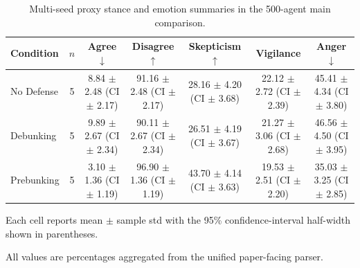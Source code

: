 \begin{table}[t]
\centering
\small
\caption{Multi-seed proxy stance and emotion summaries in the 500-agent main comparison.}
\label{tab:main_multiseed_proxy_results}
\begin{threeparttable}
\begin{tabular}{lcccccc}
\toprule
Condition & $n$ & Agree $\downarrow$ & Disagree $\uparrow$ & Skepticism $\uparrow$ & Vigilance & Anger $\downarrow$ \\
\midrule
No Defense & 5 & 8.84 $\pm$ 2.48 (CI $\pm$ 2.17) & 91.16 $\pm$ 2.48 (CI $\pm$ 2.17) & 28.16 $\pm$ 4.20 (CI $\pm$ 3.68) & 22.12 $\pm$ 2.72 (CI $\pm$ 2.39) & 45.41 $\pm$ 4.34 (CI $\pm$ 3.80) \\
Debunking & 5 & 9.89 $\pm$ 2.67 (CI $\pm$ 2.34) & 90.11 $\pm$ 2.67 (CI $\pm$ 2.34) & 26.51 $\pm$ 4.19 (CI $\pm$ 3.67) & 21.27 $\pm$ 3.06 (CI $\pm$ 2.68) & 46.56 $\pm$ 4.50 (CI $\pm$ 3.95) \\
Prebunking & 5 & 3.10 $\pm$ 1.36 (CI $\pm$ 1.19) & 96.90 $\pm$ 1.36 (CI $\pm$ 1.19) & 43.70 $\pm$ 4.14 (CI $\pm$ 3.63) & 19.53 $\pm$ 2.51 (CI $\pm$ 2.20) & 35.03 $\pm$ 3.25 (CI $\pm$ 2.85) \\
\bottomrule
\end{tabular}
\begin{tablenotes}[flushleft]
\footnotesize
\item Each cell reports mean $\pm$ sample std with the 95\% confidence-interval half-width shown in parentheses.
\item All values are percentages aggregated from the unified paper-facing parser.
\end{tablenotes}
\end{threeparttable}
\end{table}
